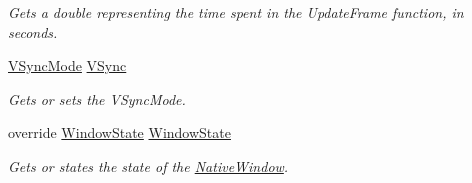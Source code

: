 \begin{DoxyCompactItemize}
\begin{DoxyCompactList}\small\item\em Gets a double representing the time spent in the Update\-Frame function, in seconds. \end{DoxyCompactList}\item 
\hyperlink{namespace_open_t_k_a1c0421cc4ecbb6d5e57317906fe8b8d3}{V\-Sync\-Mode} \hyperlink{class_open_t_k_1_1_game_window_a13246c847d807cc510fd0fa8a58ae24b}{V\-Sync}
\begin{DoxyCompactList}\small\item\em Gets or sets the V\-Sync\-Mode. \end{DoxyCompactList}\item 
override \hyperlink{namespace_open_t_k_ace9268dc87bd36f48c9d9d8b939559b4}{Window\-State} \hyperlink{class_open_t_k_1_1_game_window_a2645b832f9583c904a9e0c83951ed9d4}{Window\-State}
\begin{DoxyCompactList}\small\item\em Gets or states the state of the \hyperlink{class_open_t_k_1_1_native_window}{Native\-Window}. \end{DoxyCompactList}\end{DoxyCompactItemize}
